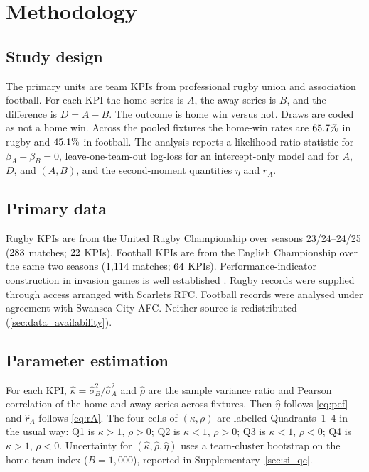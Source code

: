 \section{Methodology}
\label{sec:methods}

\subsection{Study design}

The primary units are team KPIs from professional rugby union and association football.
For each KPI the home series is $A$, the away series is $B$, and the difference is $D=A-B$.
The outcome is home win versus not.
Draws are coded as not a home win.
Across the pooled fixtures the home-win rates are $65.7\%$ in rugby and $45.1\%$ in football.
The analysis reports a likelihood-ratio statistic for $\beta_A+\beta_B=0$, leave-one-team-out log-loss for an intercept-only model and for $A$, $D$, and $(A,B)$, and the second-moment quantities $\eta$ and $r_A$.

\subsection{Primary data}

Rugby KPIs are from the United Rugby Championship over seasons 23/24--24/25 ($283$ matches; $22$ KPIs).
Football KPIs are from the English Championship over the same two seasons ($1{,}114$ matches; $64$ KPIs).
Performance-indicator construction in invasion games is well established \parencite{hughes2002,bornn2021}.
Rugby records were supplied through access arranged with Scarlets RFC.
Football records were analysed under agreement with Swansea City AFC.
Neither source is redistributed (\cref{sec:data_availability}).

\subsection{Parameter estimation}

For each KPI, $\hat\kappa=\hat\sigma_B^2/\hat\sigma_A^2$ and $\hat\rho$ are the sample variance ratio and Pearson correlation of the home and away series across fixtures.
Then $\hat\eta$ follows \cref{eq:pef} and $\hat r_A$ follows \cref{eq:rA}.
The four cells of $(\kappa,\rho)$ are labelled Quadrants~1--4 in the usual way: Q1 is $\kappa>1$, $\rho>0$; Q2 is $\kappa<1$, $\rho>0$; Q3 is $\kappa<1$, $\rho<0$; Q4 is $\kappa>1$, $\rho<0$.
Uncertainty for $(\hat\kappa,\hat\rho,\hat\eta)$ uses a team-cluster bootstrap on the home-team index ($B=1{,}000$), reported in Supplementary~\cref{sec:si_qc}.

